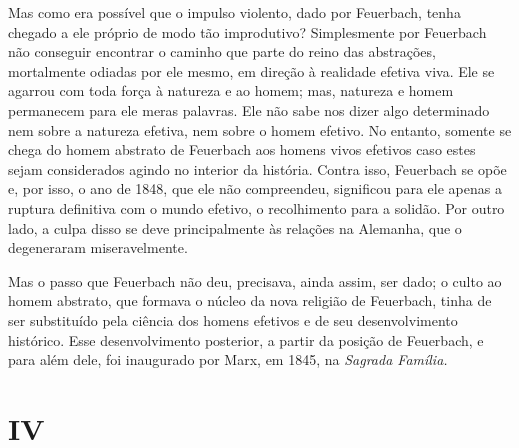 Mas como era possível que o impulso violento, dado
por Feuerbach, tenha
chegado a ele próprio de modo tão improdutivo? Simplesmente por
Feuerbach não
conseguir encontrar o caminho que parte do reino das abstrações,
mortalmente odiadas por ele mesmo, em direção à realidade efetiva viva.
Ele se agarrou com toda força à natureza e ao homem; mas, natureza e
homem permanecem para ele meras palavras. Ele não sabe nos dizer algo
determinado nem sobre a natureza efetiva, nem sobre o homem efetivo. No
entanto, somente se chega do homem abstrato
de Feuerbach aos
homens vivos efetivos caso estes sejam considerados agindo no interior
da história. Contra isso,
Feuerbach se
opõe e, por isso, o ano de 1848, que ele não compreendeu, significou %
para ele apenas a ruptura definitiva com o mundo efetivo, o recolhimento
para a solidão. Por outro lado, a culpa disso se deve principalmente às
relações na Alemanha, que o degeneraram miseravelmente.

Mas o passo
que Feuerbach não
deu, precisava, ainda assim, ser dado; o culto ao homem abstrato, que
formava o núcleo da nova religião
de Feuerbach,
tinha de ser substituído pela ciência dos homens efetivos e de seu
desenvolvimento histórico. Esse desenvolvimento posterior, a partir da
posição
de Feuerbach, e para além dele, foi inaugurado por Marx, em 1845, na \emph{Sagrada
Família.}

\quebra

\mbox{}
\vspace{2cm}

\section{IV}

